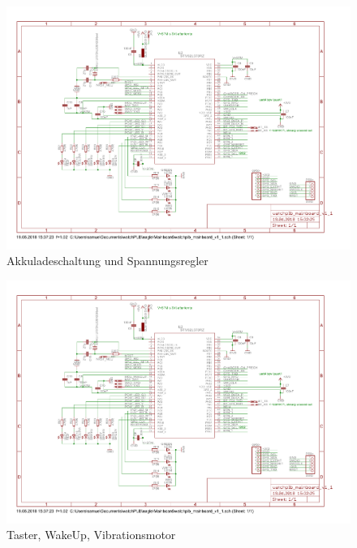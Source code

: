 \documentclass[a4paper]{scrartcl}
\begin{document}
\begin{figure}[htb]\centering
\includegraphics[page=6, angle=90, width=\linewidth]{../Mainboard/watchplb_mainboard_v1_1.pdf}
\caption{Akkuladeschaltung und Spannungsregler}
\label{fig:abb1}
\end{figure}

\begin{figure}[htb]\centering
\includegraphics[page=7, angle=90, width=\linewidth]{../Mainboard/watchplb_mainboard_v1_1.pdf}
\caption{Taster, WakeUp, Vibrationsmotor}
\label{fig:abb1}
\end{figure}
\end{document}
